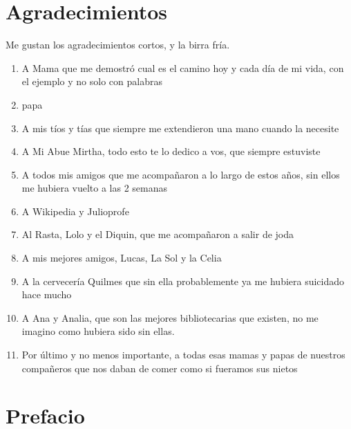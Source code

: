 \documentclass[11pt]{book}
\begin{document}
\chapter*{Agradecimientos}

Me gustan los agradecimientos cortos, y la birra fría.

\begin{enumerate}
    \item A Mama que me demostró cual es el camino hoy y cada día de mi vida, con el ejemplo y no solo con palabras
    \item papa 
    \item  A mis tíos y tías que siempre me extendieron una mano cuando la necesite
    \item A Mi Abue Mirtha, todo esto te lo dedico a vos, que siempre estuviste 
    \item A  todos mis amigos que me acompañaron a lo largo de estos años, sin ellos me hubiera vuelto a las 2 semanas 
    \item A Wikipedia y Julioprofe
    \item Al Rasta, Lolo y el Diquin, que me acompañaron a salir de joda 
    \item A mis mejores amigos, Lucas, La Sol y la Celia
    \item A la cervecería Quilmes que sin ella probablemente ya me hubiera suicidado hace mucho
    \item A Ana y Analia, que son las mejores bibliotecarias que existen, no me imagino como hubiera sido sin ellas. 
    \item Por último y no menos importante, a todas esas mamas y papas de nuestros compañeros que nos daban de comer como si fueramos sus nietos
\end{enumerate}




\chapter*{Prefacio}

\pagestyle{plain}
\end{document}
